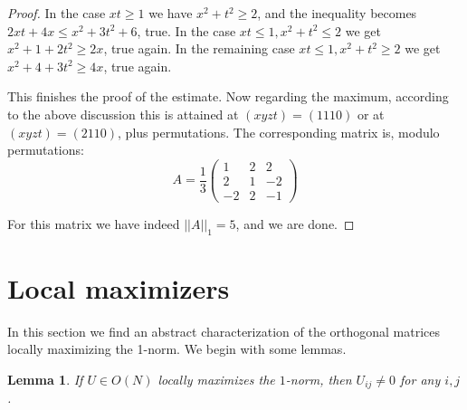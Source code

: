 \documentclass[12pt]{amsart}
\newtheorem{lemma}[theorem]{Lemma}
\begin{document}
\begin{proof}
In the case $xt\geq 1$ we have $x^2+t^2\geq 2$, and the inequality becomes $2xt+4x\leq x^2+3t^2+6$, true. In the case $xt\leq 1,x^2+t^2\leq 2$ we get $x^2+1+2t^2\geq 2x$, true again. In the remaining case $xt\leq 1,x^2+t^2\geq 2$ we get $x^2+4+3t^2\geq 4x$, true again.

This finishes the proof of the estimate. Now regarding the maximum, according to the above discussion this is attained at $(xyzt)=(1110)$ or at $(xyzt)=(2110)$, plus permutations. The corresponding matrix is, modulo permutations:
$$A=\frac{1}{3}
\begin{pmatrix}
1&2&2\\
2&1&-2\\
-2&2&-1
\end{pmatrix}$$

For this matrix we have indeed $||A||_1=5$, and we are done.
\end{proof}

\section{Local maximizers}

In this section we find an abstract characterization of the orthogonal matrices locally maximizing the 1-norm. We begin with some lemmas.

\begin{lemma}
If $U\in O(N)$ locally maximizes the $1$-norm, then $U_{ij}\neq 0$ for any $i,j$.
\end{lemma}
\end{document}
